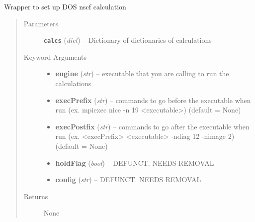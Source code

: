 \documentclass[letterpaper,10pt,english]{sphinxmanual}
\begin{document}
\begin{fulllineitems}
\label{run:run.dos}
Wrapper to set up DOS nscf calculation
\begin{quote}\begin{description}
\item[{Parameters}] \leavevmode
\textbf{\texttt{calcs}} (\emph{dict}) -- Dictionary of dictionaries of calculations

\item[{Keyword Arguments}] \leavevmode\begin{itemize}
\item {} 
\textbf{engine} (\emph{str}) --
executable that you are calling to run the calculations

\item {} 
\textbf{execPrefix} (\emph{str}) --
commands to go before the executable when run
(ex. mpiexec nice -n 19 \textless{}executable\textgreater{}) (default = None)

\item {} 
\textbf{execPostfix} (\emph{str}) --
commands to go after the executable when run
(ex. \textless{}execPrefix\textgreater{} \textless{}executable\textgreater{} -ndiag 12 -nimage 2) (default = None)

\item {} 
\textbf{holdFlag} (\emph{bool}) --
DEFUNCT. NEEDS REMOVAL

\item {} 
\textbf{config} (\emph{str}) --
DEFUNCT. NEEDS REMOVAL

\end{itemize}

\item[{Returns}] \leavevmode
None

\end{description}\end{quote}

\end{fulllineitems}

\end{document}
